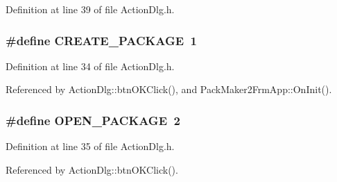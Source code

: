 Definition at line 39 of file Action\-Dlg.h.
\subsubsection{\setlength{\rightskip}{0pt plus 5cm}\#define CREATE\_\-PACKAGE~1}\label{_action_dlg_8h_d61bd8f7c345a268cb9557e313a9da33}




Definition at line 34 of file Action\-Dlg.h.

Referenced by Action\-Dlg::btn\-OKClick(), and Pack\-Maker2Frm\-App::On\-Init().
\subsubsection{\setlength{\rightskip}{0pt plus 5cm}\#define OPEN\_\-PACKAGE~2}\label{_action_dlg_8h_a7a6ba2f8033d282350c442ce8227c95}




Definition at line 35 of file Action\-Dlg.h.

Referenced by Action\-Dlg::btn\-OKClick().